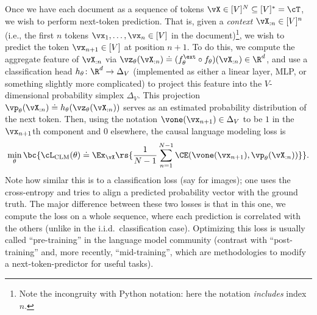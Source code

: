 \documentclass[../../book-main.tex]{subfiles}
\begin{document}
Once we have each document as a sequence of tokens \(\vX \in [V]^{N}
\subseteq [V]^{*} = \cT\), we wish to perform next-token prediction.
That is, given a \textit{context} \(\vX_{:n} \in [V]^{n}\) (i.e., the
first \(n\) tokens \(\vx_{1}, \dots, \vx_{n} \in [V]\) in the
document)\footnote{Note the incongruity with Python notation: here
the notation \textit{includes} index \(n\).}, we wish to predict the
token \(\vx_{n + 1} \in [V]\) at position \(n + 1\). To do this, we
compute the aggregate feature of \(\vX_{:n}\) via
\(\vz_{\theta}(\vX_{:n}) \doteq (f_{\theta}^{\ext} \circ
f_{\theta})(\vX_{:n}) \in \R^{d}\), and use a classification head
\(h_{\theta} \colon \R^{d} \to \Delta_{V}\) (implemented as either a
linear layer, MLP, or something slightly more complicated) to project
this feature into the \(V\)-dimensional probability simplex
\(\Delta_{V}\). This projection \(\vp_{\theta}(\vX_{:n}) \doteq
h_{\theta}(\vz_{\theta}(\vX_{:n}))\) serves as an estimated
probability distribution of the next token. Then, using the notation
\(\vone(\vx_{n + 1}) \in \Delta_{V}\) to be \(1\) in the \(\vx_{n +
1}\)th component and \(0\) elsewhere, the causal language modeling loss is
\begin{equation}\label{eq:clm_loss}
\min_{\theta}\bc{\cL_{\mathrm{CLM}}(\theta) \doteq
    \Ex_{\vX}\rs{\frac{1}{N - 1}\sum_{n = 1}^{N - 1}\CE(\vone(\vx_{n +
1}), \vp_{\theta}(\vX_{:n}))}} .
\end{equation}
Note how similar this is to a classification loss (say for images);
one uses the cross-entropy and tries to align a predicted probability
vector with the ground truth. The major difference between these two
losses is that in this one, we compute the loss on a whole sequence,
where each prediction is correlated with the others (unlike in the
i.i.d.~classification case). Optimizing this loss is usually called ``pre-training'' in the
language model community (contrast with ``post-training'' and, more
recently, ``mid-training'', which are methodologies to modify a
next-token-predictor for useful tasks).
\end{document}
